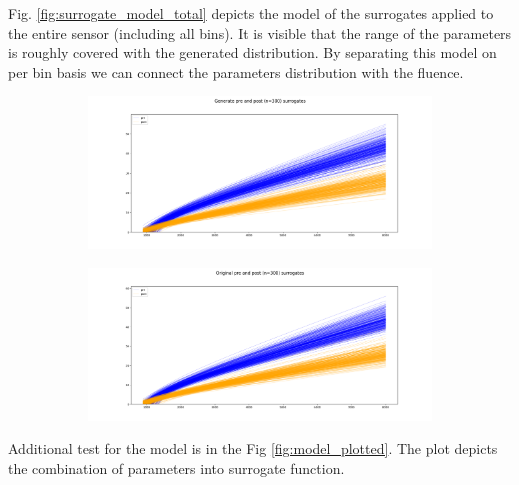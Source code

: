 Fig. \ref{fig:surrogate_model_total} depicts the model of the surrogates applied to the entire sensor (including all bins). It is visible that the range of the parameters is roughly covered with the generated distribution.
By separating this model on per bin basis we can connect the parameters distribution with the fluence.


\begin{figure}[H]
    \centering
\begin{subfigure}[b]{0.65\textwidth}
    \centering
    \includegraphics[width=\linewidth]{figures/chapter4/surrogates/p3_gen_sur.png}
  \end{subfigure}
\begin{subfigure}[b]{0.65\textwidth}
    \centering
    \includegraphics[width=\linewidth]{figures/chapter4/surrogates/p3_orig_sur.png}
  \end{subfigure}

    \label{plot:model_plotted}
\end{figure}

Additional test for the model is in the Fig \ref{fig:model_plotted}. The plot depicts the combination of parameters into surrogate function.

